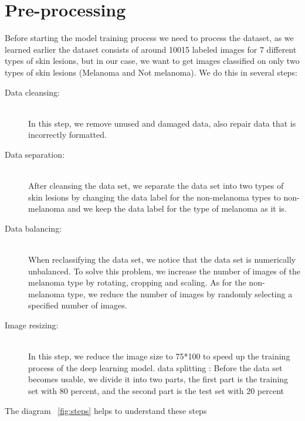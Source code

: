 \section{Pre-processing}
    Before starting the model training process we need to process the dataset, as we learned earlier the dataset consists of around 10015 labeled images for 7 different types of skin lesions, but in our case, we want to get images classified on only two types of skin lesions (Melanoma and Not melanoma). We do this in several steps:

    \begin{description}
        \item[Data cleansing: ] \hfill \\  In this step, we remove unused and damaged data, also repair data that is incorrectly formatted.

        \item[Data separation: ] \hfill \\  After cleansing the data set, we separate the data set into two types of skin lesions by changing the data label for the non-melanoma types to non-melanoma and we keep the data label for the type of melanoma as it is.

        \item[Data balancing: ] \hfill \\  When reclassifying the data set, we notice that the data set is numerically unbalanced. To solve this problem, we increase the number of images of the melanoma type by rotating, cropping and scaling. As for the non-melanoma type, we reduce the number of images by randomly selecting a specified number of images.

        \item[Image resizing: ] \hfill \\  In this step, we reduce the image size to 75*100 to speed up the training process of the deep learning model. data splitting : Before the data set becomes usable, we divide it into two parts, the first part is the training set with 80 percent, and the second part is the test set with 20 percent
    \end{description}

        The diagram ~\ref{fig:steps} helps to understand these steps

